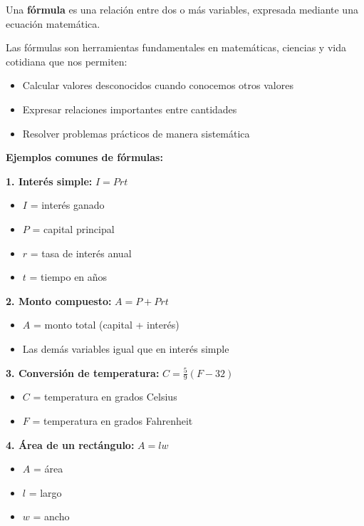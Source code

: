 


\begin{definition}
Una \textbf{fórmula} es una relación entre dos o más variables, expresada mediante una ecuación matemática.
\end{definition}

Las fórmulas son herramientas fundamentales en matemáticas, ciencias y vida cotidiana que nos permiten:
\begin{itemize}
\item Calcular valores desconocidos cuando conocemos otros valores
\item Expresar relaciones importantes entre cantidades
\item Resolver problemas prácticos de manera sistemática
\end{itemize}

\begin{example}
\textbf{Ejemplos comunes de fórmulas:}

\textbf{1. Interés simple:} $I = Prt$
\begin{itemize}
\item $I$ = interés ganado
\item $P$ = capital principal
\item $r$ = tasa de interés anual
\item $t$ = tiempo en años
\end{itemize}

\textbf{2. Monto compuesto:} $A = P + Prt$
\begin{itemize}
\item $A$ = monto total (capital + interés)
\item Las demás variables igual que en interés simple
\end{itemize}

\textbf{3. Conversión de temperatura:} $C = \frac{5}{9}(F-32)$
\begin{itemize}
\item $C$ = temperatura en grados Celsius
\item $F$ = temperatura en grados Fahrenheit
\end{itemize}

\textbf{4. Área de un rectángulo:} $A = lw$
\begin{itemize}
\item $A$ = área
\item $l$ = largo
\item $w$ = ancho
\end{itemize}
\end{example}

